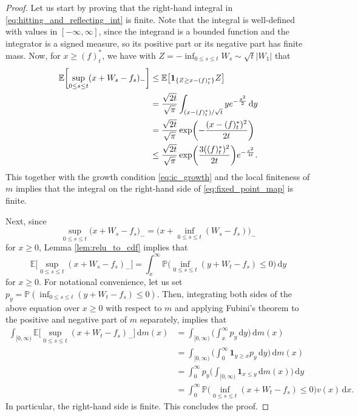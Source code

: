 \documentclass[11pt, a4paper]{article}
\theoremstyle{plain}
\theoremstyle{definition}
\theoremstyle{remark}
\numberwithin{equation}{section}
\newcommand{\ev}{\mathbb{E}}
\newcommand{\pr}{\mathbb{P}}
\renewcommand{\d}{\mathrm{d}}
\renewcommand{\bf}[1]{\mathbf{#1}}
\begin{document}
\begin{proof}
Let us start by proving that the right-hand integral in \eqref{eq:hitting_and_reflecting_int} is finite. Note that the integral is well-defined with values in $[-\infty, \infty]$, since the integrand is a bounded function and the integrator is a signed measure, so its positive part or its negative part has finite mass. Now, for $x \geq (f)^{\ast}_t$, we have with $Z = - \inf_{0 \leq s \leq t} W_s \sim \sqrt{t}\lvert W_1\rvert$ that
\begin{align} \label{eq:local_time_est}
    \ev\biggl[\sup_{0 \leq s \leq t} (x + W_s - f_s)_-\biggr] &\leq \ev\bigl[\bf{1}_{\{Z \geq x - (f)^{\ast}_t\}} Z\bigr] \notag \\
    &= \frac{\sqrt{2 t}}{\sqrt{\pi}} \int_{(x - (f)^{\ast}_t)/\sqrt{t}} y e^{-\frac{y^2}{2}} \, \d y \notag \\
    &= \frac{\sqrt{2 t}}{\sqrt{\pi}} \exp\biggl(-\frac{(x - (f)^{\ast}_t)^2}{2t}\biggr) \notag \\
    &\leq \frac{\sqrt{2 t}}{\sqrt{\pi}} \exp\biggl(\frac{3 ( (f)^{\ast}_t)^2}{2t}\biggr) e^{-\frac{x^2}{4t}}.
\end{align}
This together with the growth condition \eqref{eq:ic_growth} and the local finiteness of $m$ implies that the integral on the right-hand side of \eqref{eq:fixed_point_map} is finite.

Next, since 
\begin{equation*}
    \sup_{0 \leq s \leq t} \bigl(x + W_s - f_s\bigr)_- = \biggl(x + \inf_{0 \leq s \leq t} (W_s - f_s) \biggr)_-
\end{equation*}
for $x \geq 0$, Lemma \eqref{lem:relu_to_cdf} implies that
\begin{equation*}
    \ev\biggl[\sup_{0 \leq s \leq t} (x + W_s - f_s)_-\biggr] = \int_x^{\infty} \pr\biggl(\inf_{0 \leq s \leq t} (y + W_t - f_s) \leq 0\biggr) \, \d y
\end{equation*}
for $x \geq 0$. For notational convenience, let us set $p_y = \pr(\inf_{0 \leq s \leq t} (y + W_t - f_s) \leq 0)$. Then, integrating both sides of the above equation over $x \geq 0$ with respect to $m$ and applying Fubini's theorem to the positive and negative part of $m$ separately, implies that
\begin{align*}
    \int_{[0, \infty)} \ev\biggl[\sup_{0 \leq s \leq t} (x + W_t - f_s)_-\biggr] \, \d m(x) &= \int_{[0, \infty)} \biggl(\int_x^{\infty} p_y \, \d y \biggr) \, \d m(x) \\
    &= \int_{[0, \infty)} \biggl(\int_0^{\infty} \bf{1}_{y \geq x} p_y \, \d y \biggr) \, \d m(x) \\
    &= \int_0^{\infty} p_y \biggl(\int_{[0, \infty)} \bf{1}_{x \leq y} \, \d m(x)\biggr) \, \d y \\
    &= \int_0^{\infty} \pr\biggl(\inf_{0 \leq s \leq t} (x + W_t - f_s) \leq 0\biggr) v(x) \, \d x.
\end{align*}
In particular, the right-hand side is finite. This concludes the proof.
\end{proof}
\end{document}
